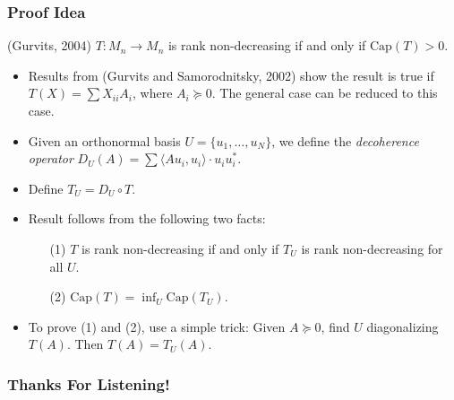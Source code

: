 \documentclass[handout,usenames,dvipsnames,12pt]{beamer}
\begin{document}
\begin{frame}
    \frametitle{Proof Idea}

    (Gurvits, 2004) $T: M_n \to M_n$ is rank non-decreasing if and only if $\text{Cap}(T) > 0$.

    \begin{itemize}
        \pause
        \item Results from (Gurvits and Samorodnitsky, 2002) show the result is true if $T(X) = \sum X_{ii} A_i$, where $A_i \succeq 0$. The general case can be reduced to this case.

        \pause
        \item Given an orthonormal basis $U = \{ u_1, \dots, u_N \}$, we define the \emph{decoherence operator} $D_U(A) = \sum \langle Au_i, u_i \rangle \cdot u_i u_i^*$.

        \pause
        \item Define $T_U = D_U \circ T$.

        \pause
        \item Result follows from the following two facts:
        \begin{itemize}
            \pause
            \item[(1)] $T$ is rank non-decreasing if and only if $T_U$ is rank non-decreasing for all $U$.
            
            \pause
            \item[(2)] $\text{Cap}(T) = \inf_U \text{Cap}(T_U)$.
        \end{itemize}

        \pause
        \item To prove (1) and (2), use a simple trick: Given $A \succeq 0$, find $U$ diagonalizing $T(A)$. Then $T(A) = T_U(A)$.
    \end{itemize}
\end{frame}


\begin{frame}
    \frametitle{Thanks For Listening!}
\end{frame}
\end{document}
